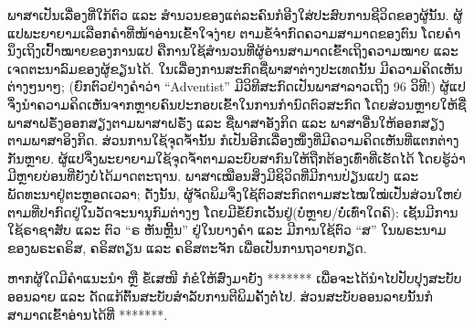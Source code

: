ພາສາເປັນເລື່ອງທີ່ໃກ້ຕົວ ແລະ ສຳນວນຂອງແຕ່ລະຄົນກໍອີງໃສ່ປະສົບການຊີວິດຂອງຜູ້ນັ້ນ. ຜູ້ແປພະຍາຍາມເລືອກຄຳທີ່ໜ້າອ່ານເຂົ້າໃຈງ່າຍ ຕາມຂໍ້ຈຳກົດຄວາມສາມາດຂອງຕົນ ໂດຍຄຳນຶງເຖິງເປົ້າໝາຍຂອງການແປ ຄືການໃຊ້ສຳນວນທີ່ຜູ້ອ່ານສາມາດເຂົ້າເຖິງຄວາມໝາຍ ແລະ ເຈດຕະນາລົມຂອງຜູ້ຂຽນໄດ້. ໃນເລື່ອງການສະກົດຊື່ພາສາຕ່າງປະເທດນັ້ນ ມີຄວາມຄິດເຫັນຕ່າງໆນາໆ; (ຍົກຕົວຢ່າງຄຳວ່າ “Adventist” ມີວິທີສະກົດເປັນພາສາລາວເຖິງ 96 ວິທີ!) ຜູ້ແປຈຶ່ງນຳຄວາມຄິດເຫັນຈາກຫຼາຍຄົນປະກອບເຂົ້າໃນການກຳນົດຕົວສະກົດ ໂດຍສ່ວນຫຼາຍໃຫ້ຊື່ພາສາຝຣັ່ງອອກສຽງຕາມພາສາຝຣັ່ງ ແລະ ຊື່ພາສາອັງກິດ ແລະ ພາສາອື່ນໃຫ້ອອກສຽງຕາມພາສາອິງກິດ. ສ່ວນການໃຊ້ຈຸດຈ້ຳນັ້ນ ກໍເປັນອີກເລື່ອງໜຶ່ງທີ່ມີຄວາມຄິດເຫັນທີ່ແຕກຕ່າງກັນຫຼາຍ. ຜູ້ແປຈຶ່ງພະຍາຍາມໃຊ້ຈຸດຈ້ຳຕາມລະບົບສາກົນໃຫ້ຖືກຕ້ອງເທົ່າທີ່ເຮັດໄດ້ ໂດຍຮູ້ວ່າ ມີຫຼາຍບ່ອນທີ່ຍັງບໍ່ໄດ້ມາດຕະຖານ. 
ພາສາເໝືອນສິ່ງມີຊິວິດທີ່ມີການປ່ຽນແປງ ແລະ ພັດທະນາຢູ່ຕະຫຼອດເວລາ; ດັ່ງນັ້ນ, ຜູ້ຈັດພິມຈຶ່ງໃຊ້ຕົວສະກົດຕາມສະໄໝໃໝ່ເປັ່ນສ່ວນໃຫຍ່ຕາມທີ່ປາກົດຢູ່ໃນວັດຈະນານຸກົມຕ່າງໆ ໂດຍມີຂໍ້ຍົກເວັ້ນຢູ່(ບໍ່ຫຼາຍ/ບໍ່ເທົ່າໃດຄົ): ເຊັ້ນມີການໃຊ້ຣາຊາສັບ ແລະ ຕົວ “ຣ ຫັນຫຼີ້ນ” ຢູ່ໃນບາງຄຳ ແລະ ມີການໃຊ້ຕົວ “ສ” ໃນພຣະນາມຂອງພຣະຄຣິສ, ຄຣິສຕຽນ ແລະ ຄຣິສຕະຈັກ ເພື່ອເປັນການຖວາຍກຽດ. 

ຫາກຜູ້ໃດມີຄຳແນະນຳ ຫຼື ຂໍ້ເສໜີ ກໍຂໍໃຫ້ສົ່ງມາຍັງ ******* ເພື່ອຈະໄດ້ນຳໄປປັບປຸງສະບັບອອນລາຍ ແລະ ດັດແກ້ຕົ້ນສະບັບສຳລັບການຕີພິມຄັ້ງຕໍ່ໄປ. ສ່ວນສະບັບອອນລາຍນັ້ນກໍສາມາດເຂົ້າອ່ານໄດ້ທີ່ *******.
